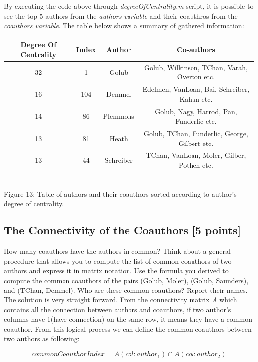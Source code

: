 \documentclass[unicode,11pt,a4paper,oneside,numbers=endperiod,openany]{scrartcl}
\begin{document}
{By executing the code above through \textit{degreeOfCentrality.m} script, it is possible to see the top 5 authors from the \textit{authors variable} and their coauthros from the \textit{coauthors variable}. The table below shows a summary of gathered information: }\\
\vspace{30px}
\begin{center}
\begin{tabular}{| c | c | c | c |}
\hline
 Degree Of Centrality & Index & Author & Co-authors \\
 \hline
 32 & 1 & Golub & Golub, Wilkinson, TChan, Varah, Overton etc. \\
 \hline
 16 & 104 & Demmel & Edelmen, VanLoan, Bai, Schreiber, Kahan etc. \\
 \hline
 14 & 86 & Plemmons & Golub, Nagy, Harrod, Pan, Funderlic etc. \\
 \hline
 13 & 81 & Heath & Golub, TChan, Funderlic, George, Gilbert etc. \\
 \hline
 13 & 44 & Schreiber & TChan, VanLoan, Moler, Gilber, Pothen etc. \\
 \hline
\end{tabular}\\
\vspace{5px}
{Figure 13: Table of authors and their coauthors sorted according to author's degree of centrality}.\\
\end{center}
\vspace{30px}

\subsection{The Connectivity of the Coauthors [5 points]}

{How many coauthors have the authors in common? Think about a general procedure that allows you to compute the list of common coauthors of two authors and express it in matrix notation. Use the formula you derived to compute the common coauthors of the pairs (Golub, Moler), (Golub, Saunders), and (TChan, Demmel). Who are these common coauthors? Report their names.}\\

{The solution is very straight forward. From the connectivity matrix \textit{A} which contains all the connection between authors and coauthors, if two author's columns have 1(have connection) on the same row, it means they have a common coauthor. From this logical process we can define the common coauthors between two authors as following:}\\
\begin{center}
\begin{equation}
commonCoauthorIndex = A(col: author_1) \cap A(col: author_2)
\end{equation}\\
\end{center}
\vspace{30px}
\end{document}
